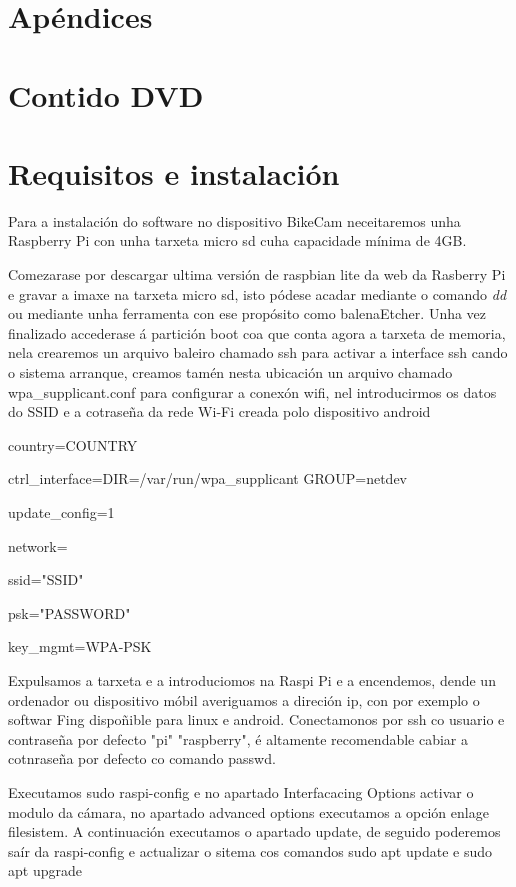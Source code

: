 \newpage
\chapter{Apéndices}
\thispagestyle{empty}

\chapter{Contido DVD}

\chapter{Requisitos e instalación}
Para a instalación do software no dispositivo BikeCam neceitaremos unha Raspberry Pi con unha tarxeta micro sd cuha capacidade mínima de 4GB.

Comezarase por descargar ultima versión de raspbian lite da web da Rasberry Pi e gravar a imaxe na tarxeta micro sd, isto pódese acadar mediante o comando \emph{dd} ou mediante unha ferramenta con ese propósito como balenaEtcher.
Unha vez finalizado accederase á partición boot coa que conta agora a tarxeta de memoria, nela crearemos un arquivo baleiro chamado ssh para activar a interface ssh cando o sistema arranque, creamos tamén nesta ubicación un arquivo chamado wpa\_supplicant.conf para configurar a conexón wifi, nel introducirmos os datos do SSID e a cotraseña da rede Wi-Fi creada polo dispositivo android

	country=COUNTRY

	ctrl\_interface=DIR=/var/run/wpa\_supplicant GROUP=netdev

	update\_config=1

	network={

	  \indent     ssid="SSID"

	   \indent    psk="PASSWORD"

	   \indent    key\_mgmt=WPA-PSK

	    }

Expulsamos a tarxeta e a introduciomos na Raspi Pi e a encendemos, dende un ordenador ou dispositivo móbil averiguamos a direción ip, con por exemplo o softwar Fing dispoñible para linux e android. Conectamonos por ssh co usuario e contraseña por defecto "pi" "raspberry", é altamente recomendable cabiar a cotnraseña por defecto co comando passwd.

Executamos sudo raspi-config e no apartado Interfacacing Options activar o modulo da cámara, no apartado advanced options executamos a opción enlage filesistem. A continuación executamos o apartado update, de seguido poderemos saír da raspi-config e actualizar o sitema cos comandos
sudo apt update e
sudo apt upgrade

